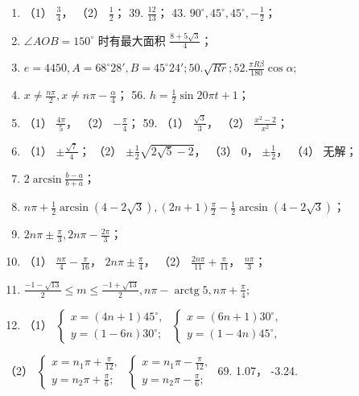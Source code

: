\begin{enumerate}[start=38]
\item
  （1） \(\frac{3}{4}\)， （2） \(\frac{1}{2}\)； 39.
  \(\frac{12}{13}\)； 43.
  \(90^{\circ}, 45^{\circ}, 45^{\circ}, -\frac{1}{2}\)；
\item
  \(\angle AOB = 150^{\circ}\) 时有最大面积
  \(\frac{8 + 5\sqrt{3}}{4}\)；
\item
  \(e = 4450, A = 68^{\circ}28', B = 45^{\circ}24'; 50. \sqrt{Rr}; 52. \frac{\pi R\beta}{180} \cos \alpha;\)
\item
  \(x \neq \frac{n\pi}{2}, x \neq n\pi - \frac{\alpha}{4}\)； 56.
  \(h = \frac{1}{2} \sin 20\pi t + 1\)；
\item
  （1） \(\frac{4\pi}{5}\)， （2） \(-\frac{\pi}{4}\)； 59. （1）
  \(\frac{\sqrt{3}}{3}\)， （2） \(\frac{x^2 - 2}{x^2}\)；
\item
  （1） \(\pm \frac{\sqrt{7}}{4}\)； （2）
  \(\pm \frac{1}{2}\sqrt{2\sqrt{5} - 2}\)， （3） 0，
  \(\pm \frac{1}{2}\)， （4） 无解；
\item
  \(2\arcsin\frac{b-a}{b+a}\)；
\item
  \(n\pi + \frac{1}{2} \arcsin (4 - 2\sqrt{3}), (2n + 1)\frac{\pi}{2} - \frac{1}{2} \arcsin (4 - 2\sqrt{3})\)；
\item
  \(2n\pi \pm \frac{\pi}{3}, 2n\pi - \frac{2\pi}{3}\)；
\item
  （1） \(\frac{n\pi}{4} - \frac{\pi}{16}\)，
  \(2n\pi \pm \frac{\pi}{4}\)， （2）
  \(\frac{2n\pi}{11} + \frac{\pi}{11}\)， \(\frac{n\pi}{3}\)；
\item
  \(\frac{-1 - \sqrt{13}}{2} \leqslant m \leqslant \frac{-1 + \sqrt{13}}{2}, n\pi - \operatorname{arctg} 5, n\pi + \frac{\pi}{4};\)
\item
  （1）
  \(\left\{ \begin{array}{l} x = (4n + 1)45^{\circ}, \\ y = (1 - 6n)30^{\circ}; \end{array} \right.\)
  \(\left\{ \begin{array}{l} x = (6n + 1)30^{\circ}, \\ y = (1 - 4n)45^{\circ}, \end{array} \right.\)
\end{enumerate}

（2）
\(\left\{ \begin{array}{l} x = n_1\pi + \frac{\pi}{12}, \\ y = n_2\pi + \frac{\pi}{6}; \end{array} \right.\)
\(\left\{ \begin{array}{l} x = n_1\pi - \frac{\pi}{12}, \\ y = n_2\pi - \frac{\pi}{6}; \end{array} \right.\)
69. 1.07， -3.24.

